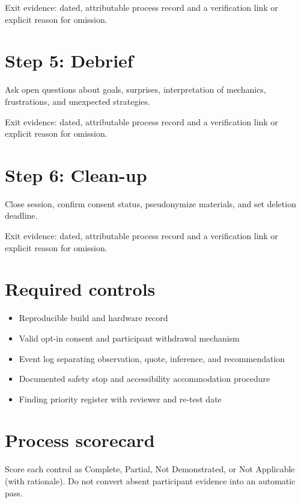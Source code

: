 \documentclass[11pt]{article}
\begin{document}
Exit evidence: dated, attributable process record and a verification link or explicit reason for omission.


\section{Step 5: Debrief}
Ask open questions about goals, surprises, interpretation of mechanics, frustrations, and unexpected strategies.

Exit evidence: dated, attributable process record and a verification link or explicit reason for omission.


\section{Step 6: Clean-up}
Close session, confirm consent status, pseudonymize materials, and set deletion deadline.

Exit evidence: dated, attributable process record and a verification link or explicit reason for omission.


\section{Required controls}
\begin{itemize}
\item Reproducible build and hardware record
\item Valid opt-in consent and participant withdrawal mechanism
\item Event log separating observation, quote, inference, and recommendation
\item Documented safety stop and accessibility accommodation procedure
\item Finding priority register with reviewer and re-test date
\end{itemize}

\section{Process scorecard}
Score each control as Complete, Partial, Not Demonstrated, or Not Applicable (with rationale). Do not convert absent participant evidence into an automatic pass.
\end{document}
